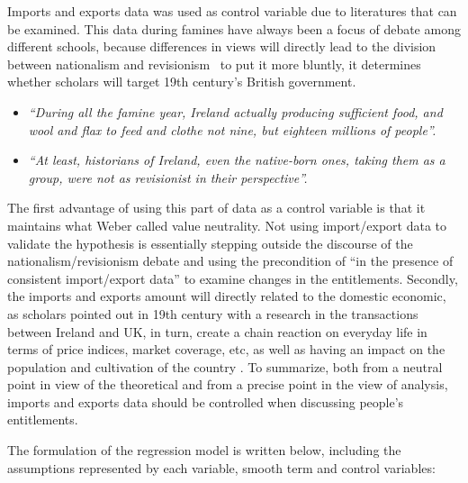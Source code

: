 Imports and exports data was used as control variable due to literatures that can be examined. This data during famines have always been a focus of debate among different schools, because differences in views will directly lead to the division between nationalism and revisionism \textemdash\ to put it more bluntly, it determines whether scholars will target 19th century's British government. 

\begin{itemize}
    \item [] \textit{``During all the famine year, Ireland actually producing sufficient food, and wool and flax to feed and clothe not nine, but eighteen millions of people''.} \citep{mitchel1905apology}
    \item [] \textit{``At least, historians of Ireland, even the native-born ones, taking them as a group, were not as revisionist in their perspective''.}\citep{donnelly1996construction}
\end{itemize}

The first advantage of using this part of data as a control variable is that it maintains what Weber called value neutrality. Not using import/export data to validate the hypothesis is essentially stepping outside the discourse of the nationalism/revisionism debate and using the precondition of ``in the presence of consistent import/export data'' to examine changes in the entitlements. Secondly, the imports and exports amount will directly related to the domestic economic, as scholars \citep{hansard1840flour} pointed out in 19th century with a research in the transactions between Ireland and UK, in turn, create a chain reaction on everyday life in terms of price indices, market coverage, etc, as well as having an impact on the population and cultivation of the country \citep{solar2015ireland}. To summarize, both from a neutral point in view of the theoretical and from a precise point in the view of analysis, imports and exports data should be controlled when discussing people's entitlements.

The formulation of the regression model is written below, including the assumptions represented by each variable, smooth term and control variables:

